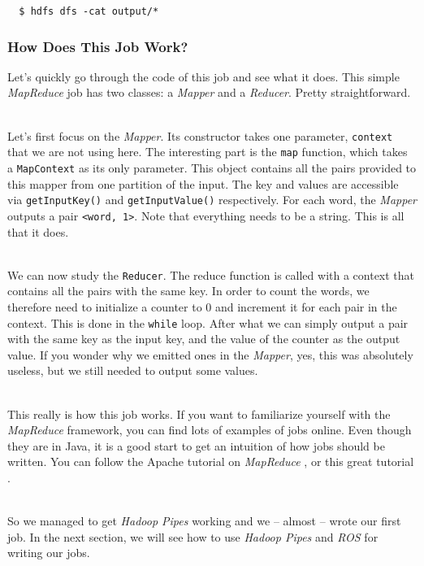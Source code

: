 \documentclass[a4paper, 12pt]{article}
\begin{document}
\begin{verbatim}
  $ hdfs dfs -cat output/*
\end{verbatim}

    \subsubsection{How Does This Job Work?}
  
Let's quickly go through the code of this job and see what it does. This simple \textit{MapReduce} job has two classes: a \textit{Mapper} and a \textit{Reducer}. Pretty straightforward.

~\\
Let's first focus on the \textit{Mapper}. Its constructor takes one parameter, \texttt{context} that we are not using here. The interesting part is the \texttt{map} function, which takes a \texttt{MapContext} as its only parameter. This object contains all the pairs provided to this mapper from one partition of the input. The key and values are accessible via \texttt{getInputKey()} and \texttt{getInputValue()} respectively. For each word, the \textit{Mapper} outputs a pair \texttt{<word, 1>}. Note that everything needs to be a string. This is all that it does.

~\\
We can now study the \texttt{Reducer}. The reduce function is called with a context that contains all the pairs with the same key. In order to count the words, we therefore need to initialize a counter to 0 and increment it for each pair in the context. This is done in the \texttt{while} loop. After what we can simply output a pair with the same key as the input key, and the value of the counter as the output value. If you wonder why we emitted ones in the \textit{Mapper}, yes, this was absolutely useless, but we still needed to output some values.

~\\
This really is how this job works. If you want to familiarize yourself with the \textit{MapReduce} framework, you can find lots of examples of jobs online. Even though they are in Java, it is a good start to get an intuition of how jobs should be written. You can follow the Apache tutorial on \textit{MapReduce} \cite{hadoop_mapreduce_tutorial}, or this great tutorial \cite{slideshare_tuto}.

~\\
So we managed to get \textit{Hadoop Pipes} working and we -- almost -- wrote our first job. In the next section, we will see how to use \textit{Hadoop Pipes} and \textit{ROS} for writing our jobs.
\end{document}
